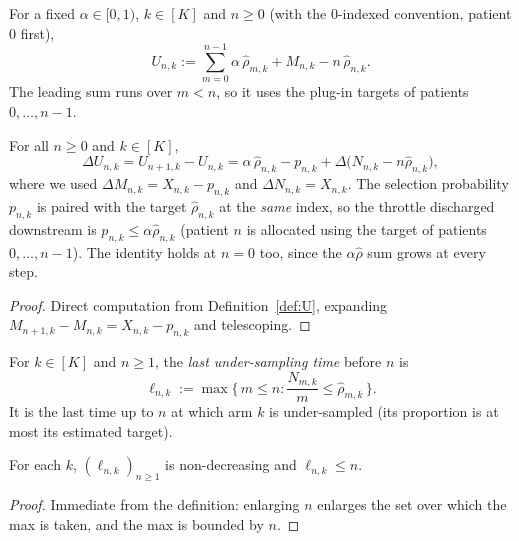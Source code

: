 \begin{definition}\label{def:U}
\leanok
{}
For a fixed $\alpha \in [0,1)$, $k \in [K]$ and $n \ge 0$ (with the $0$-indexed convention,
patient $0$ first),
\[
  U_{n,k} := \sum_{m=0}^{n-1} \alpha\, \hat{\rho}_{m,k} + M_{n,k} - n\, \hat{\rho}_{n,k}.
\]
The leading sum runs over $m < n$, so it uses the plug-in targets of patients $0,\dots,n-1$.
\end{definition}

\begin{lemma}[Increment of $U$]\label{lem:U_increment}
\leanok
{}
For all $n \ge 0$ and $k \in [K]$,
\[
  \Delta U_{n,k} = U_{n+1,k} - U_{n,k}
  = \alpha\, \hat{\rho}_{n,k} - p_{n,k} + \Delta\big(N_{n,k} - n\hat{\rho}_{n,k}\big),
\]
where we used $\Delta M_{n,k} = X_{n,k} - p_{n,k}$ and $\Delta N_{n,k} = X_{n,k}$. The selection
probability $p_{n,k}$ is paired with the target $\hat\rho_{n,k}$ at the \emph{same} index, so the
throttle discharged downstream is $p_{n,k} \le \alpha\hat\rho_{n,k}$ (patient $n$ is allocated using
the target of patients $0,\dots,n-1$). The identity holds at $n=0$ too, since the $\alpha\hat\rho$
sum grows at every step.
\end{lemma}

\begin{proof}\leanok
Direct computation from Definition~\ref{def:U}, expanding
$M_{n+1,k} - M_{n,k} = X_{n,k} - p_{n,k}$ and telescoping.
\end{proof}

\begin{definition}\label{def:hitting}
\leanok
{}
For $k \in [K]$ and $n \ge 1$, the \emph{last under-sampling time} before $n$ is
\[
  \ell_{n,k} := \max\Big\{\, m \le n : \frac{N_{m,k}}{m} \le \hat{\rho}_{m,k} \,\Big\}.
\]
It is the last time up to $n$ at which arm $k$ is under-sampled (its proportion
is at most its estimated target).
\end{definition}

\begin{lemma}\label{lem:hitting_basic}
\leanok
{}
For each $k$, $(\ell_{n,k})_{n\ge1}$ is non-decreasing and $\ell_{n,k} \le n$.
\end{lemma}

\begin{proof}\leanok
Immediate from the definition: enlarging $n$ enlarges the set over which the max
is taken, and the max is bounded by $n$.
\end{proof}

